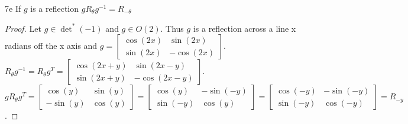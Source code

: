 \documentclass{article}
\begin{document}
\begin{claim}{7e}
    If $g$ is a reflection $g R_{\theta} g^{-1} = R_{-\theta}$
\end{claim}
\begin{proof}
    Let $g \in \det^*(-1)$ and $g \in O(2)$. Thus $g$ is a reflection across a line x radians off the x axis and $g = \begin{bmatrix}
        \cos(2x) & \sin(2x) \\ \sin(2x) & -\cos(2x)
    \end{bmatrix}$. $R_{\theta} g^{-1} = R_{\theta} g^T = \begin{bmatrix}
        \cos(2x+y) & \sin(2x-y) \\ \sin(2x+y) & -\cos(2x-y)
    \end{bmatrix}$. $g R_{\theta} g^T = \begin{bmatrix}
        \cos(y) & \sin(y) \\ -\sin(y) & \cos(y)
    \end{bmatrix} = \begin{bmatrix}
        \cos(y) & -\sin(-y) \\ \sin(-y) & \cos(y)
    \end{bmatrix} = \begin{bmatrix}
        \cos(-y) & -\sin(-y) \\ \sin(-y) & \cos(-y)
    \end{bmatrix} = R_{-y}$.
\end{proof}
\end{document}
